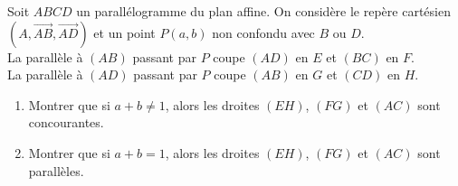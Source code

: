 \documentclass[11pt,a4paper]{article}
\newcommand{\vect}[1]{\overrightarrow{#1}}
\begin{document}
\begin{enoncebox}
Soit $ABCD$ un parallélogramme du plan affine. On considère le repère cartésien $(A, \vect{AB}, \vect{AD})$ et un point $P(a, b)$ non confondu avec $B$ ou $D$.\\
La parallèle à $(AB)$ passant par $P$ coupe $(AD)$ en $E$ et $(BC)$ en $F$.\\
La parallèle à $(AD)$ passant par $P$ coupe $(AB)$ en $G$ et $(CD)$ en $H$.
\begin{enumerate}
    \item Montrer que si $a + b \neq 1$, alors les droites $(EH)$, $(FG)$ et $(AC)$ sont concourantes.
    \item Montrer que si $a + b = 1$, alors les droites $(EH)$, $(FG)$ et $(AC)$ sont parallèles.
\end{enumerate}
\end{enoncebox}
\end{document}
